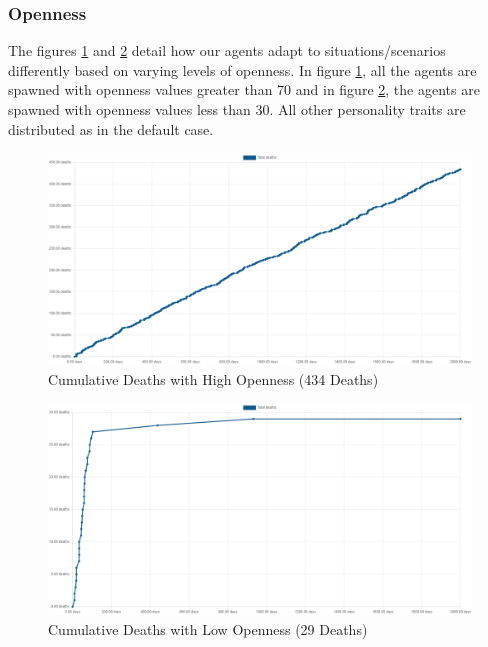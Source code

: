 \subsubsection{Openness}
\label{subsubsec: Openness}

The figures \ref{fig: High Openness} and \ref{fig: Low Openness} detail how our agents adapt to situations/scenarios differently based on varying levels of openness. In figure \ref{fig: High Openness}, all the agents are spawned with openness values greater than 70 and in figure \ref{fig: Low Openness}, the agents are spawned with openness values less than 30. All other personality traits are distributed as in the default case.

\begin{figure}[H]
    \begin{center}
        \includegraphics[scale=0.25]{Images/Cumulative Deaths, With Treaties, T7Only, 2000days, 20food, High Openness, 434deaths.png}
    \end{center}
    \caption{Cumulative Deaths with High Openness (434 Deaths)}
    \label{fig: High Openness}
\end{figure}

\begin{figure}[H]
    \begin{center}
        \includegraphics[scale=0.25]{Images/Cumulative Deaths, With Treaties, T7Only, 2000days, 20food, Low Openness, 29deaths.png}
    \end{center}
    \caption{Cumulative Deaths with Low Openness (29 Deaths)}
    \label{fig: Low Openness}
\end{figure}

